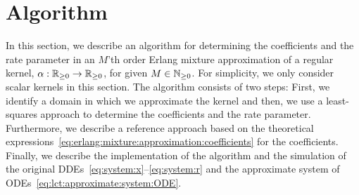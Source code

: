 \section{Algorithm}\label{sec:algo}
In this section, we describe an algorithm for determining the coefficients and the rate parameter in an $M$'th order Erlang mixture approximation of a regular kernel, $\alpha: \mathbb{R}_{\geq 0} \rightarrow \mathbb{R}_{\geq 0}$, for given $M \in \mathbb{N}_{\geq 0}$. For simplicity, we only consider scalar kernels in this section. The algorithm consists of two steps: First, we identify a domain in which we approximate the kernel and then, we use a least-squares approach to determine the coefficients and the rate parameter. Furthermore, we describe a reference approach based on the theoretical expressions~\eqref{eq:erlang:mixture:approximation:coefficients} for the coefficients. Finally, we describe the implementation of the algorithm and the simulation of the original DDEs~\eqref{eq:system:x}--\eqref{eq:system:r} and the approximate system of ODEs~\eqref{eq:lct:approximate:system:ODE}.

